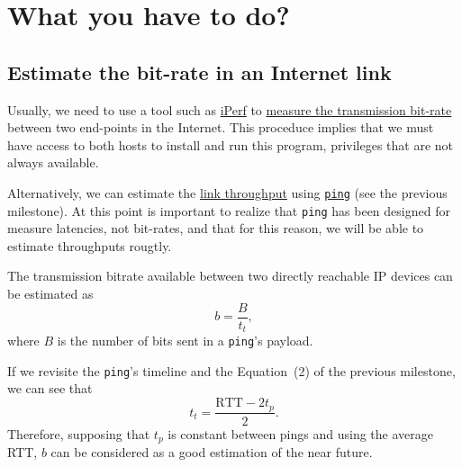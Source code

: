 \section{What you have to do?}

\subsection{Estimate the bit-rate in an Internet link}

Usually, we need to use a tool such as \href{https://iperf.fr/}{iPerf}
to
\href{https://en.wikipedia.org/wiki/Measuring_network_throughput}{measure
  the transmission bit-rate} between two end-points in the
Internet. This proceduce implies that we must have access to both
hosts to install and run this program, privileges that are not always
available.

Alternatively, we can estimate the
\href{https://en.wikipedia.org/wiki/Throughput}{link throughput} using
\href{https://github.com/torvalds/linux/blob/master/net/ipv4/ping.c}{\texttt{ping}}
(see the previous milestone). At this point is important to realize
 that
\texttt{ping} has been designed for measure latencies, not bit-rates,
and that for this reason, we will be able to estimate throughputs
rougtly.

The transmission bitrate available between two directly reachable IP
devices can be estimated as
\begin{equation}
  b=\frac{B}{t_t},
  \label{eq:b}
\end{equation}
where $B$ is the number of bits sent in a \texttt{ping}'s payload.

If we revisite the \texttt{ping}'s timeline and the Equation~(2) of
the previous milestone, we can see that
\begin{equation}
  t_t = \frac{\text{RTT}-2t_p}{2}.
  \label{eq:tt}
\end{equation}
Therefore, supposing that $t_p$ is constant between pings and using
the average RTT, $b$ can be considered as a good estimation of the
near future.

